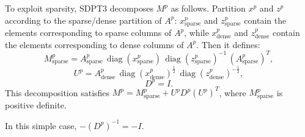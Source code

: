 To exploit sparsity, SDPT3 decomposes $M^p$ as follows.
Partition $x^p$ and $z^p$ according to the sparse/dense partition of $A^p$:
$x^p_{\mathrm{sparse}}$ and $z^p_{\mathrm{sparse}}$ contain the elements corresponding to sparse columns of $A^p$,
while $x^p_{\mathrm{dense}}$ and $z^p_{\mathrm{dense}}$ contain the elements corresponding to dense columns of $A^p$.
Then it defines:
\[
   M^p_{\mathrm{sparse}}
   = A^p_{\mathrm{sparse}}
     \,\operatorname{diag}(x^p_{\mathrm{sparse}})
     \,\operatorname{diag}(z^p_{\mathrm{sparse}})^{-1}
     \,(A^p_{\mathrm{sparse}})^T,
\]
\[
   U^p
   = A^p_{\mathrm{dense}}
     \,\operatorname{diag}(x^p_{\mathrm{dense}})^{\tfrac12}
     \,\operatorname{diag}(z^p_{\mathrm{dense}})^{-\tfrac12},
\]
\[ D^p = I. \]
This decomposition satisfies $M^p = M^p_{\mathrm{sparse}} + U^p D^p (U^p)^T$,
where $M^p_{\mathrm{sparse}}$ is positive definite.

In this simple case, $-(D^p)^{-1} = -I$.
